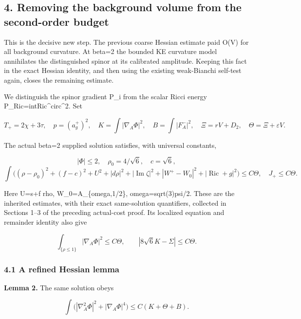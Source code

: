 \documentclass[
  10pt,
]{article}
\begin{document}
\hypertarget{removing-the-background-volume-from-the-second-order-budget}{%
\subsection{4. Removing the background volume from the second-order
budget}\label{removing-the-background-volume-from-the-second-order-budget}}

This is the decisive new step. The previous coarse Hessian estimate paid
O(V) for all background curvature. At beta=2 the bounded KE curvature
model annihilates the distinguished spinor at its calibrated amplitude.
Keeping this fact in the exact Hessian identity, and then using the
existing weak-Bianchi self-test again, closes the remaining estimate.

We distinguish the spinor gradient P\_i from the scalar Ricci energy
P\_Ric=int\textbar Ric\^{}circ\textbar\^{}2. Set

\[
 T_+=2\chi+3\tau,\quad p=(a_g^+)^2,\quad
 K=\int|\nabla_A\Phi|^2,\quad B=\int|F_A^-|^2,
 \quad \Xi=rV+D_2,\quad\Theta=\Xi+\varepsilon V.
\]

The actual beta=2 supplied solution satisfies, with universal constants,

\[
 |\Phi|\le2,\quad \rho_0=4/\sqrt6,\quad c=\sqrt6,
\] \[
 \int\bigl((\rho-\rho_0)^2+(f-c)^2+U^2+|d\rho|^2
       +|\operatorname{Im}\zeta|^2+|W^+-W_0|^2
       +|\operatorname{Ric}+g|^2\bigr)\le C\Theta,
 \quad J_+\le C\Theta.                              \tag{4.1}
\]

Here U=s+f rho, W\_0=A\_\{omega,1/2\}, omega=sqrt(3)psi/2. These are the
inherited estimates, with their exact same-solution quantifiers,
collected in Sections 1--3 of the preceding actual-cost proof. Its
localized equation and remainder identity also give

\[
 \int_{\{\rho\le1\}}|\nabla_A\Phi|^2\le C\Theta,
 \qquad |8\sqrt6 K-\Sigma|\le C\Theta.               \tag{4.2}
\]

\hypertarget{a-refined-hessian-lemma}{%
\subsubsection{4.1 A refined Hessian
lemma}\label{a-refined-hessian-lemma}}

\textbf{Lemma 2.} The same solution obeys

\[
 \boxed{\int\bigl(|\nabla_A^2\Phi|^2+|\nabla_A\Phi|^4\bigr)
               \le C(K+\Theta+B).}                  \tag{4.3}
\]
\end{document}
